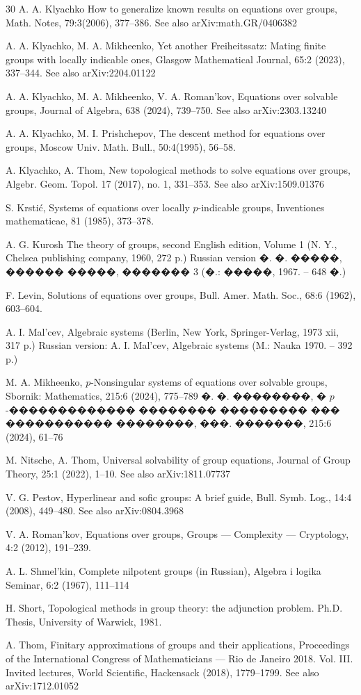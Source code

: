 \documentclass{article}
\theoremstyle{definition}
\theoremstyle{remark}
\begin{document}
\begin{thebibliography}{30}
A. A. Klyachko
How to generalize known results on equations over groups,
Math. Notes,
79:3(2006),
377--386.
See also arXiv:math.GR/0406382

A. A. Klyachko, M. A. Mikheenko,
Yet another Freiheitssatz: Mating finite groups with locally indicable ones,
Glasgow Mathematical Journal,
65:2 (2023), 337--344.
See also arXiv:2204.01122

A. A. Klyachko, M. A. Mikheenko, V. A. Roman'kov,
Equations over solvable groups,
Journal of Algebra,
638 (2024),
739--750.
See also arXiv:2303.13240

A. A. Klyachko, M. I. Prishchepov,
The descent method for equations over groups,
Moscow Univ. Math. Bull.,
50:4(1995),
56--58.

A. Klyachko, A. Thom,
New topological methods to solve equations over
groups, Algebr. Geom. Topol.
17 (2017), no. 1, 331--353.
See also arXiv:1509.01376

S. Krsti\'c, 
Systems of equations over locally $p$-indicable groups,
Inventiones mathematicae,
81 (1985), 373--378.

A. G. Kurosh
The theory of groups,
second English edition,
Volume 1
(N. Y.,
Chelsea publishing company,
1960,
272 p.)
Russian version
�. �. �����,
������ �����,
������� 3
(�.:
�����,
1967. --
648 �.)
\fi

F. Levin,
Solutions of equations over groups,
{Bull. Amer. Math. Soc.},
{68:6} (1962), 603--604.

A. I. Mal'cev,
Algebraic systems
(Berlin, New York,
Springer-Verlag,
1973 xii,
317 p.)
Russian version:
A. I. Mal'cev,
Algebraic systems
(M.:
Nauka
1970. --
392 p.)
\fi

M. A. Mikheenko,
$p$-Nonsingular systems of equations
over solvable groups,
Sbornik: Mathematics,
215:6
(2024),
775--789
�. �. ��������,
� $p$-������������� �������� ���������
��� ����������� ��������,
���. �������,
215:6
(2024),
61--76
\fi

M. Nitsche, A. Thom,
Universal solvability of group equations,
Journal of Group Theory,
25:1 (2022), 1--10.
See also arXiv:1811.07737

V. G. Pestov,
Hyperlinear and sofic groups: A brief guide,
Bull. Symb. Log., 14:4 (2008), 449--480.
See also arXiv:0804.3968

V. A. Roman'kov,
Equations over groups,
Groups --- Complexity --- Cryptology,
4:2 (2012), 191--239.

A. L. Shmel'kin,
Complete nilpotent groups (in Russian),
Algebra i logika Seminar,
6:2
(1967),
111--114

H. Short,
Topological methods in group theory: the adjunction problem.
Ph.D. Thesis,
University of Warwick, 1981.

A. Thom,
Finitary approximations of groups and their applications,
Proceedings of the International Congress of Mathematicians ---
Rio de Janeiro 2018. Vol. III.
Invited lectures, World Scientific, Hackensack
(2018), 1779--1799.
See also arXiv:1712.01052
\end{thebibliography}
\end{document}
